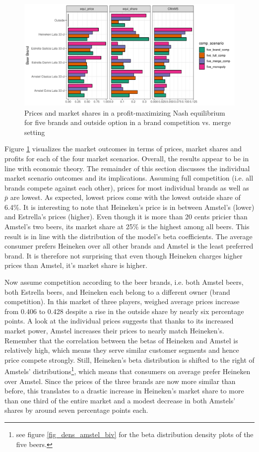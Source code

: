 \documentclass[12pt,a4paper]{article}
\begin{document}
\begin{figure}[ht]
	\centering
  \includegraphics[scale = 0.7]{figures/bar_price_share_brand_merge_5.pdf}
	\caption{Prices and market shares in a profit-maximizing Nash equilibrium for five brands and outside option in a brand competition vs. merge setting}
	\label{fig_bar_five}
\end{figure}

Figure \ref{fig_bar_five} visualizes the market outcomes in terms of prices, market shares and profits for each of the four market scenarios.
Overall, the results appear to be in line with economic theory.
The remainder of this section discusses the individual market scenario outcomes and its implications.
Assuming full competition (i.e. all brands compete against each other), prices for most individual brands as well as $\bar{p}$ are lowest.
As expected, lowest prices come with the lowest outside share of 6.4\%.
It is interesting to note that Heineken's price is in between Amstel's (lower) and Estrella's prices (higher).
Even though it is more than 20 cents pricier than Amstel's two beers, its market share at 25\% is the highest among all beers.
This result is in line with the distribution of the model's beta coefficients.
The average consumer prefers Heineken over all other brands and Amstel is the least preferred brand.
It is therefore not surprising that even though Heineken charges higher prices than Amstel, it's market share is higher.

Now assume competition according to the beer brands, i.e. both Amstel beers, both Estrella beers, and Heineken each belong to a different owner (brand competition).
In this market of three players, weighed average prices increase from 0.406 to 0.428\text{ \euro } despite a rise in the outside share by nearly six percentage points.
A look at the individual prices suggests that thanks to its increased market power, Amstel increases their prices to nearly match Heineken's.
Remember that the correlation between the betas of Heineken and Amstel is relatively high, which means they serve similar customer segments and hence price compete strongly.
Still, Heineken's beta distribution is shifted to the right of Amstels' distributions\footnote{see figure \ref{fig_dens_amstel_biv} for the beta distribution density plots of the five beers.}, which means that consumers on average prefer Heineken over Amstel.
Since the prices of the three brands are now more similar than before, this translates to a drastic increase in Heineken's market share to more than one third of the entire market and a modest decrease in both Amstels' shares by around seven percentage points each.
\end{document}
